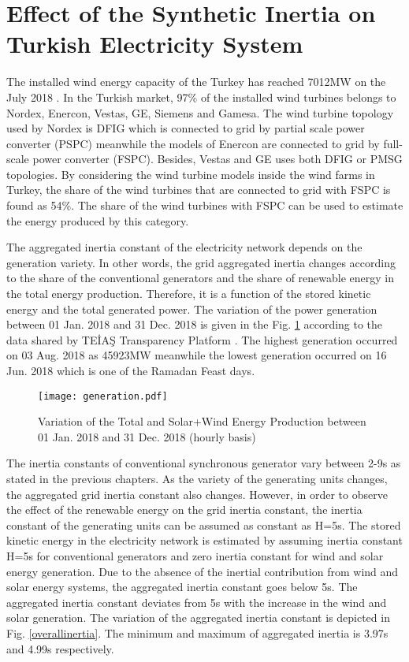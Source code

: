 \section{Effect of the Synthetic Inertia on Turkish Electricity System}
The installed wind energy capacity of the Turkey has reached 7012MW on the July 2018 \cite{July2018}. In the Turkish market, 97\% of the installed wind turbines belongs to Nordex, Enercon, Vestas, GE, Siemens and Gamesa. The wind turbine topology used by Nordex is DFIG which is connected to grid by partial scale power converter (PSPC) meanwhile the models of Enercon are connected to grid by full-scale power converter (FSPC). Besides, Vestas and GE uses both DFIG or PMSG topologies. By considering the wind turbine models inside the wind farms in Turkey, the share of the wind turbines that are connected to grid with FSPC is found as 54\%. The share of the wind turbines with FSPC can be used to estimate the energy produced by this category. \par
The aggregated inertia constant of the electricity network depends on the generation variety. In other words, the grid aggregated inertia changes according to the share of the conventional generators and the share of renewable energy in the total energy production. Therefore, it is a function of the stored kinetic energy and the total generated power. The variation of the power generation between 01 Jan. 2018 and 31 Dec. 2018 is given in the Fig. \ref{overallprod} according to the data shared by TEİAŞ Transparency Platform \cite{TEIAS2019}. The highest generation occurred on 03 Aug. 2018 as 45923MW meanwhile the lowest generation occurred on 16 Jun. 2018 which is one of the Ramadan Feast days. \par
\begin{figure}[h!]
	\centering
	\texttt{[image: generation.pdf]}
	\caption[Variation of the Total and Solar+Wind Energy Production between 01 Jan. 2018 and 31 Dec. 2018 (hourly basis)]{Variation of the Total and Solar+Wind Energy Production between 01 Jan. 2018 and 31 Dec. 2018 (hourly basis)\cite{TEIAS2019}}
	\label{overallprod}
\end{figure}
The  inertia constants of conventional synchronous generator vary between 2-9s \cite{Kundur} as stated in the previous chapters. As the variety of the generating units changes, the aggregated grid inertia constant also changes. However, in order to observe the effect of the renewable energy on the grid inertia constant, the inertia constant of the generating units can be assumed as constant as H=5s. The stored kinetic energy in the electricity network is estimated by assuming inertia constant H=5s for conventional generators and zero inertia constant for wind and solar energy generation. Due to the absence of the inertial contribution from wind and solar energy systems, the aggregated inertia constant goes below 5s. The aggregated inertia constant deviates from 5s with the increase in the wind and solar generation. The variation of the aggregated inertia constant is depicted in Fig. \ref{overallinertia}. The minimum and maximum of aggregated inertia is 3.97s and 4.99s respectively.\par
